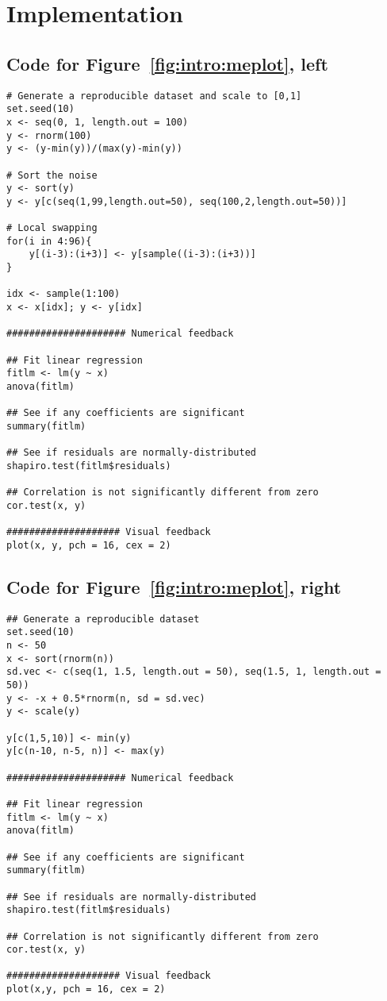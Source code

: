 \chapter{Implementation\label{ch:implementation}}

\lstset{basicstyle=\ttfamily\footnotesize,xleftmargin=0cm,breaklines=true,language=R}

\section{Code for Figure~\ref{fig:intro:meplot}, left}
\label{sec:appendicies:me1plot}
{
\begin{lstlisting}
# Generate a reproducible dataset and scale to [0,1]
set.seed(10)
x <- seq(0, 1, length.out = 100)
y <- rnorm(100)
y <- (y-min(y))/(max(y)-min(y))

# Sort the noise
y <- sort(y)
y <- y[c(seq(1,99,length.out=50), seq(100,2,length.out=50))]

# Local swapping
for(i in 4:96){
	y[(i-3):(i+3)] <- y[sample((i-3):(i+3))]
}

idx <- sample(1:100)
x <- x[idx]; y <- y[idx]

##################### Numerical feedback

## Fit linear regression
fitlm <- lm(y ~ x)
anova(fitlm)

## See if any coefficients are significant
summary(fitlm)

## See if residuals are normally-distributed
shapiro.test(fitlm$residuals)

## Correlation is not significantly different from zero
cor.test(x, y)

#################### Visual feedback
plot(x, y, pch = 16, cex = 2)
\end{lstlisting}
}


\section{Code for Figure~\ref{fig:intro:meplot}, right}
\label{sec:appendicies:me2plot}
{
\begin{lstlisting}
## Generate a reproducible dataset
set.seed(10)
n <- 50
x <- sort(rnorm(n))
sd.vec <- c(seq(1, 1.5, length.out = 50), seq(1.5, 1, length.out = 50))
y <- -x + 0.5*rnorm(n, sd = sd.vec)
y <- scale(y)

y[c(1,5,10)] <- min(y)
y[c(n-10, n-5, n)] <- max(y)

##################### Numerical feedback

## Fit linear regression
fitlm <- lm(y ~ x)
anova(fitlm)

## See if any coefficients are significant
summary(fitlm)

## See if residuals are normally-distributed
shapiro.test(fitlm$residuals) 

## Correlation is not significantly different from zero
cor.test(x, y)

#################### Visual feedback
plot(x,y, pch = 16, cex = 2)
\end{lstlisting}
}


